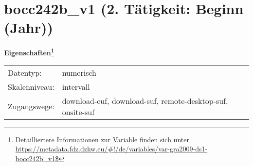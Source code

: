 
    \setcounter{footnote}{0}

    \vspace*{-1.8cm}
	\section{bocc242b\_v1 (2. Tätigkeit: Beginn (Jahr))}
	\label{section:bocc242b_v1}



    \vspace*{0.5cm}
    \noindent\textbf{Eigenschaften\footnote{Detailliertere Informationen zur Variable finden sich unter
		\url{https://metadata.fdz.dzhw.eu/\#!/de/variables/var-gra2009-ds1-bocc242b_v1$}}}\\
	\begin{tabularx}{\hsize}{@{}lX}
	Datentyp: & numerisch \\
	Skalenniveau: & intervall \\
	Zugangswege: &
	  download-cuf, 
	  download-suf, 
	  remote-desktop-suf, 
	  onsite-suf
 \\
    \end{tabularx}



